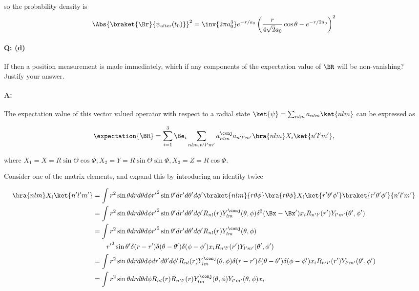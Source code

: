 {so the probability density is
\begin{equation}\label{eqn:qmIexamPractice2007Dec:4:300}
\Abs{\braket{\Br}{\psi_{\text{after}}(t_0)}}^2
= \inv{2 \pi a_0^3}
e^{-r/a_0} 
\left(
\frac{r}{4\sqrt{2} a_0} \cos\theta
-e^{-r/2 a_0}
\right)^2 
\end{equation}

\paragraph{Q: (d)}

If then a position measurement is made immediately, which if any components of the expectation value of \(\BR\) will be non-vanishing?  Justify your answer.

\paragraph{A:}

The expectation value of this vector valued operator with respect to a radial state \(\ket{\psi} = \sum_{nlm} a_{nlm} \ket{nlm}\) can be expressed as

\begin{equation}\label{eqn:qmIexamPractice2007Dec:4:400}
\expectation{\BR} = \sum_{i=1}^3 \Be_i \sum_{nlm, n'l'm'} 
a_{nlm}^\conj a_{n'l'm'} 
\bra{nlm} X_i
\ket{n'l'm'},
\end{equation}

where \(X_1 = X = R \sin\Theta \cos\Phi, X_2 = Y = R \sin\Theta \sin\Phi, X_3 = Z = R \cos\Phi\).

Consider one of the matrix elements, and expand this by introducing an identity twice

\begin{equation}\label{eqn:qmIexamPractice:550}
\begin{aligned}
\bra{nlm} X_i \ket{n'l'm'}
&=
\int 
r^2 \sin\theta dr d\theta d\phi
{r'}^2 \sin\theta' dr' d\theta' d\phi'
\braket{nlm}{r \theta \phi} \bra{r \theta \phi} X_i \ket{r' \theta' \phi' }\braket{r' \theta' \phi'}{n'l'm'} \\
&=
\int 
r^2 \sin\theta dr d\theta d\phi
{r'}^2 \sin\theta' dr' d\theta' d\phi'
R_{nl}(r) Y_{lm}^\conj(\theta,\phi)
\delta^3(\Bx - \Bx') x_i
R_{n'l'}(r') Y_{l'm'}(\theta',\phi')
\\
&=
\int 
r^2 \sin\theta dr d\theta d\phi
{r'}^2 \sin\theta' dr' d\theta' d\phi'
R_{nl}(r) Y_{lm}^\conj(\theta,\phi) \\
&\qquad{r'}^2 \sin\theta' \delta(r-r') \delta(\theta - \theta') \delta(\phi-\phi')
x_i
R_{n'l'}(r') Y_{l'm'}(\theta',\phi')
\\
&=
\int 
r^2 \sin\theta dr d\theta d\phi
dr' d\theta' d\phi'
R_{nl}(r) Y_{lm}^\conj(\theta,\phi) 
\delta(r-r') \delta(\theta - \theta') \delta(\phi-\phi')
x_i
R_{n'l'}(r') Y_{l'm'}(\theta',\phi')
\\
&=
\int 
r^2 \sin\theta dr d\theta d\phi
R_{nl}(r) R_{n'l'}(r) 
Y_{lm}^\conj(\theta,\phi) Y_{l'm'}(\theta,\phi)
x_i
\\
\end{aligned}
\end{equation}

}
